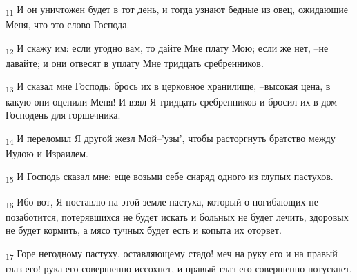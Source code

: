 \begin{tcolorbox}
\textsubscript{11} И он уничтожен будет в тот день, и тогда узнают бедные из овец, ожидающие Меня, что это слово Господа.
\end{tcolorbox}
\begin{tcolorbox}
\textsubscript{12} И скажу им: если угодно вам, то дайте Мне плату Мою; если же нет, --не давайте; и они отвесят в уплату Мне тридцать сребренников.
\end{tcolorbox}
\begin{tcolorbox}
\textsubscript{13} И сказал мне Господь: брось их в церковное хранилище, --высокая цена, в какую они оценили Меня! И взял Я тридцать сребренников и бросил их в дом Господень для горшечника.
\end{tcolorbox}
\begin{tcolorbox}
\textsubscript{14} И переломил Я другой жезл Мой--'узы', чтобы расторгнуть братство между Иудою и Израилем.
\end{tcolorbox}
\begin{tcolorbox}
\textsubscript{15} И Господь сказал мне: еще возьми себе снаряд одного из глупых пастухов.
\end{tcolorbox}
\begin{tcolorbox}
\textsubscript{16} Ибо вот, Я поставлю на этой земле пастуха, который о погибающих не позаботится, потерявшихся не будет искать и больных не будет лечить, здоровых не будет кормить, а мясо тучных будет есть и копыта их оторвет.
\end{tcolorbox}
\begin{tcolorbox}
\textsubscript{17} Горе негодному пастуху, оставляющему стадо! меч на руку его и на правый глаз его! рука его совершенно иссохнет, и правый глаз его совершенно потускнет.
\end{tcolorbox}
